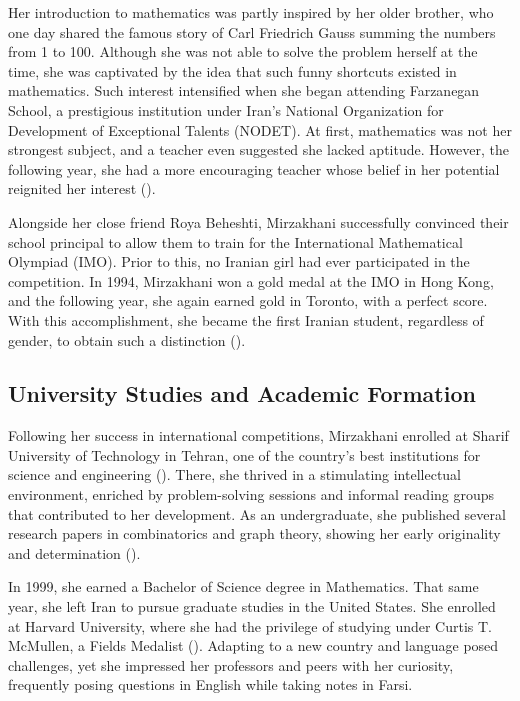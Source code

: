Her introduction to mathematics was partly inspired by her older brother, who one day shared the famous story of Carl Friedrich Gauss summing the numbers from 1 to 100. Although she was not able to solve the problem herself at the time, she was captivated by the idea that such funny shortcuts existed in mathematics. Such interest intensified when she began attending Farzanegan School, a prestigious institution under Iran's National Organization for Development of Exceptional Talents (NODET). At first, mathematics was not her strongest subject, and a teacher even suggested she lacked aptitude. However, the following year, she had a more encouraging teacher whose belief in her potential reignited her interest (\cite{gibbons}).

Alongside her close friend Roya Beheshti, Mirzakhani successfully convinced their school principal to allow them to train for the International Mathematical Olympiad (IMO). Prior to this, no Iranian girl had ever participated in the competition. In 1994, Mirzakhani won a gold medal at the IMO in Hong Kong, and the following year, she again earned gold in Toronto, with a perfect score. With this accomplishment, she became the first Iranian student, regardless of gender, to obtain such a distinction (\cite{gibbons,series}).

\subsection{University Studies and Academic Formation}
Following her success in international competitions, Mirzakhani enrolled at Sharif University of Technology in Tehran, one of the country's best institutions for science and engineering (\cite{series}). There, she thrived in a stimulating intellectual environment, enriched by problem-solving sessions and informal reading groups that contributed to her development. As an undergraduate, she published several research papers in combinatorics and graph theory, showing her early originality and determination (\cite{gibbons}).

In 1999, she earned a Bachelor of Science degree in Mathematics. That same year, she left Iran to pursue graduate studies in the United States. She enrolled at Harvard University, where she had the privilege of studying under Curtis T. McMullen, a Fields Medalist (\cite{gibbons,series}). Adapting to a new country and language posed challenges, yet she impressed her professors and peers with her curiosity, frequently posing questions in English while taking notes in Farsi.

